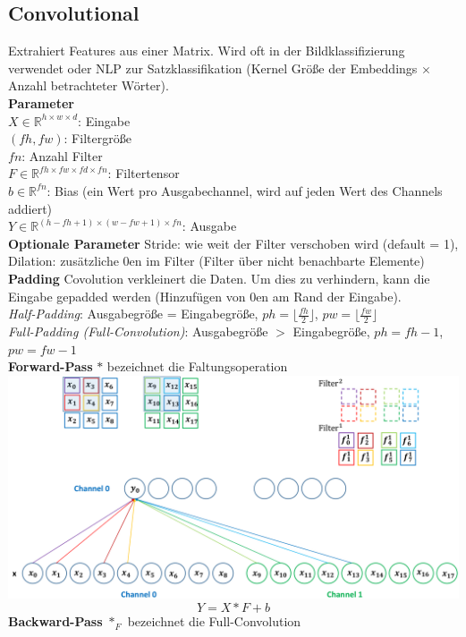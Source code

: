 \documentclass[12pt]{article}
\newcommand{\R}{\mathbb{R}}
\begin{document}
	\subsection{Convolutional}
	Extrahiert Features aus einer Matrix. Wird oft in der Bildklassifizierung verwendet oder NLP zur Satzklassifikation (Kernel Größe der Embeddings $\times$ Anzahl betrachteter Wörter).\\
	\textbf{Parameter}\\
	$X \in \R^{h \times w \times d}$: Eingabe\\
	$(fh, fw)$: Filtergröße\\
	$fn$: Anzahl Filter\\
	$F \in \R^{fh \times fw \times fd \times fn}$: Filtertensor\\
	$b \in \R^{fn}$: Bias (ein Wert pro Ausgabechannel, wird auf jeden Wert des Channels addiert)\\
	$Y \in \R^{(h-fh+1) \times (w-fw+1) \times fn}$: Ausgabe\\
	\textbf{Optionale Parameter} Stride: wie weit der Filter verschoben wird (default = 1), Dilation: zusätzliche 0en im Filter (Filter über nicht benachbarte Elemente)\\
	\textbf{Padding} Covolution verkleinert die Daten. Um dies zu verhindern, kann die Eingabe gepadded werden (Hinzufügen von 0en am Rand der Eingabe).\\
	\textit{Half-Padding}: Ausgabegröße = Eingabegröße, $ph = \lfloor \frac{fh}{2} \rfloor$, $pw = \lfloor \frac{fw}{2} \rfloor$\\
	\textit{Full-Padding (Full-Convolution)}: Ausgabegröße $>$ Eingabegröße, $ph = fh - 1$, $pw = fw - 1$\\
	\textbf{Forward-Pass} $*$ bezeichnet die Faltungsoperation\\
	\includegraphics[width=\linewidth]{figures/convolution.png}
	$$Y = X * F + b$$
	\textbf{Backward-Pass} $*_F$ bezeichnet die Full-Convolution\\
\end{document}
